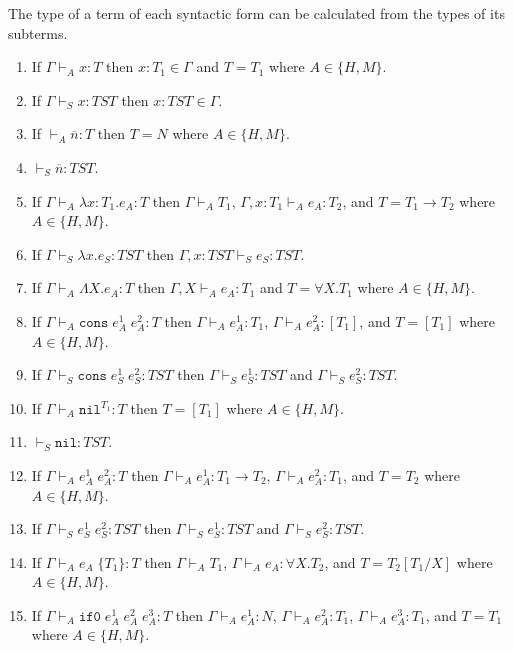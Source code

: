 \begin{lemma}
\label{i}
\onehalfspacing
The type of a term of each syntactic form can be calculated from the types of its subterms.
\begin{enumerate}
\item If $\Gamma\vdash_{A}x:T$ then $x:T_{1}\in\Gamma$ and $T=T_{1}$ where $A\in\lbrace H,M\rbrace$.
\item If $\Gamma\vdash_{S}x:TST$ then $x:TST\in\Gamma$.
\item If $\vdash_{A}\overline{n}:T$ then $T=N$ where $A\in\lbrace H,M\rbrace$.
\item $\vdash_{S}\overline{n}:TST$.
\item If $\Gamma\vdash_{A}\lambda x:T_{1}.e_{A}:T$ then $\Gamma\vdash_{A}T_{1}$, $\Gamma,x:T_{1}\vdash_{A}e_{A}:T_{2}$, and $T=T_{1}\rightarrow T_{2}$ where $A\in\lbrace H,M\rbrace$.
\item If $\Gamma\vdash_{S}\lambda x.e_{S}:TST$ then $\Gamma,x:TST\vdash_{S}e_{S}:TST$.
\item If $\Gamma\vdash_{A}\Lambda X.e_{A}:T$ then $\Gamma,X\vdash_{A}e_{A}:T_{1}$ and $T=\forall X.T_{1}$ where $A\in\lbrace H,M\rbrace$.
\item If $\Gamma\vdash_{A}\mathtt{cons}\;e_{A}^{1}\;e_{A}^{2}:T$ then $\Gamma\vdash_{A}e_{A}^{1}:T_{1}$, $\Gamma\vdash_{A}e_{A}^{2}:[T_{1}]$, and $T=[T_{1}]$ where $A\in\lbrace H,M\rbrace$.
\item If $\Gamma\vdash_{S}\mathtt{cons}\;e_{S}^{1}\;e_{S}^{2}:TST$ then $\Gamma\vdash_{S}e_{S}^{1}:TST$ and $\Gamma\vdash_{S}e_{S}^{2}:TST$.
\item If $\Gamma\vdash_{A}\mathtt{nil}^{T_{1}}:T$ then $T=[T_{1}]$ where $A\in\lbrace H,M\rbrace$.
\item $\vdash_{S}\mathtt{nil}:TST$.
\item If $\Gamma\vdash_{A}e_{A}^{1}\;e_{A}^{2}:T$ then $\Gamma\vdash_{A}e_{A}^{1}:T_{1}\rightarrow T_{2}$, $\Gamma\vdash_{A}e_{A}^{2}:T_{1}$, and $T=T_{2}$ where $A\in\lbrace H,M\rbrace$.
\item If $\Gamma\vdash_{S}e_{S}^{1}\;e_{S}^{2}:TST$ then $\Gamma\vdash_{S}e_{S}^{1}:TST$ and $\Gamma\vdash_{S}e_{S}^{2}:TST$.
\item If $\Gamma\vdash_{A}e_{A}\;\lbrace T_{1}\rbrace:T$ then $\Gamma\vdash_{A}T_{1}$, $\Gamma\vdash_{A}e_{A}:\forall X.T_{2}$, and $T=T_{2}[T_{1}/X]$ where $A\in\lbrace H,M\rbrace$.
\item If $\Gamma\vdash_{A}\mathtt{if0}\;e_{A}^{1}\;e_{A}^{2}\;e_{A}^{3}:T$ then $\Gamma\vdash_{A}e_{A}^{1}:N$, $\Gamma\vdash_{A}e_{A}^{2}:T_{1}$, $\Gamma\vdash_{A}e_{A}^{3}:T_{1}$, and $T=T_{1}$ where $A\in\lbrace H,M\rbrace$.

\end{enumerate}
\end{lemma}
